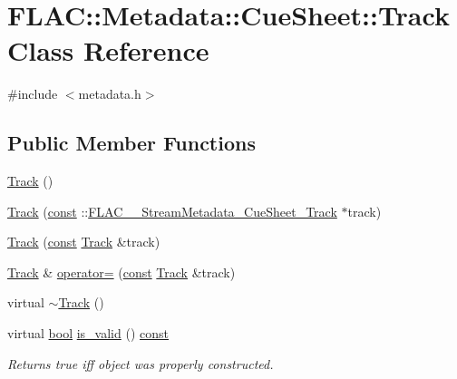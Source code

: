 \hypertarget{class_f_l_a_c_1_1_metadata_1_1_cue_sheet_1_1_track}{}\section{F\+L\+AC\+:\+:Metadata\+:\+:Cue\+Sheet\+:\+:Track Class Reference}
\label{class_f_l_a_c_1_1_metadata_1_1_cue_sheet_1_1_track}


{\ttfamily \#include $<$metadata.\+h$>$}

\subsection*{Public Member Functions}
\begin{DoxyCompactItemize}
\item 
\hyperlink{class_f_l_a_c_1_1_metadata_1_1_cue_sheet_1_1_track_a2020e7d808cd693eae52a77a09aaeb13}{Track} ()
\item 
\hyperlink{class_f_l_a_c_1_1_metadata_1_1_cue_sheet_1_1_track_a975a75ced858b78a6918d43db30c005b}{Track} (\hyperlink{getopt1_8c_a2c212835823e3c54a8ab6d95c652660e}{const} \+::\hyperlink{struct_f_l_a_c_____stream_metadata___cue_sheet___track}{F\+L\+A\+C\+\_\+\+\_\+\+Stream\+Metadata\+\_\+\+Cue\+Sheet\+\_\+\+Track} $\ast$track)
\item 
\hyperlink{class_f_l_a_c_1_1_metadata_1_1_cue_sheet_1_1_track_aabbe8498d7e40419ef672426ea099782}{Track} (\hyperlink{getopt1_8c_a2c212835823e3c54a8ab6d95c652660e}{const} \hyperlink{class_f_l_a_c_1_1_metadata_1_1_cue_sheet_1_1_track}{Track} \&track)
\item 
\hyperlink{class_f_l_a_c_1_1_metadata_1_1_cue_sheet_1_1_track}{Track} \& \hyperlink{class_f_l_a_c_1_1_metadata_1_1_cue_sheet_1_1_track_a980f2feefa46137c7ca7148df9a7f959}{operator=} (\hyperlink{getopt1_8c_a2c212835823e3c54a8ab6d95c652660e}{const} \hyperlink{class_f_l_a_c_1_1_metadata_1_1_cue_sheet_1_1_track}{Track} \&track)
\item 
virtual \hyperlink{class_f_l_a_c_1_1_metadata_1_1_cue_sheet_1_1_track_a435e024baf22a5bbcc78e87ba4863f4a}{$\sim$\+Track} ()
\item 
virtual \hyperlink{mac_2config_2i386_2lib-src_2libsoxr_2soxr-config_8h_abb452686968e48b67397da5f97445f5b}{bool} \hyperlink{class_f_l_a_c_1_1_metadata_1_1_cue_sheet_1_1_track_aca6ab35c5dc3615527a580d5a849fd19}{is\+\_\+valid} () \hyperlink{getopt1_8c_a2c212835823e3c54a8ab6d95c652660e}{const} 
\begin{DoxyCompactList}\small\item\em Returns {\ttfamily true} iff object was properly constructed. \end{DoxyCompactList}\item 

\end{DoxyCompactItemize}
